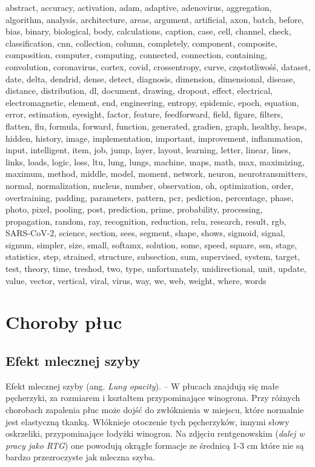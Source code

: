 \documentclass{article}
\begin{document}
abstract, accuracy, activation, adam, adaptive, adenovirus, aggregation, algorithm, analysis, architecture, areas, argument, artificial, axon, batch, before, bias, binary, biological, body, calculations, caption, case, cell, channel, check, classification, cnn, collection, column, completely, component, composite, composition, computer, computing, connected, connection, containing, convolution, coronavirus, cortex, covid, crossentropy, curve, częstotliwośś, dataset, date, delta, dendrid, dense, detect, diagnosis, dimension, dimensional, disease, distance, distribution, dl, document, drawing, dropout, effect, electrical, electromagnetic, element, end, engineering, entropy, epidemic, epoch, equation, error, estimation, eyesight, factor, feature, feedforward, field, figure, filters, flatten, flu, formula, forward, function, generated, gradien, graph, healthy, heaps, hidden, history, image, implementation, important, improvement, inflammation, input, intelligent, item, job, jump, layer, layout, learning, letter, linear, lines, links, loads, logic, loss, ltu, lung, lungs, machine, maps, math, max, maximizing, maximum, method, middle, model, moment, network, neuron, neurotransmitters, normal, normalization, nucleus, number, observation, oh, optimization, order, overtraining, padding, parameters, pattern, pcr, pediction, percentage, phase, photo, pixel, pooling, post, prediction, prime, probability, processing, propagation, random, ray, recognition, reduction, relu, research, result, rgb, SARS-CoV-2, science, section, sees, segment, shape, shows, sigmoid, signal, signum, simpler, size, small, softamx, solution, some, speed, square, ssn, stage, statistics, step, strained, structure, subsection, sum, supervised, system, target, test, theory, time, treshod, two, type, unfortunately, unidirectional, unit, update, value, vector, vertical, viral, virus, way, we, web, weight, where, words



\section{Choroby płuc}

\subsection{Efekt mlecznej szyby}
Efekt mlecznej szyby (ang. \textit{Lung opacity}). – W płucach znajdują się małe pęcherzyki, za rozmiarem i kształtem przypominające winogrona. Przy różnych chorobach zapalenia płuc może dojść do zwłóknienia w miejscu, które normalnie jest elastyczną tkanką. Włóknieje otoczenie tych pęcherzyków, innymi słowy oskrzeliki, przypominające łodyżki winogron. Na zdjęciu rentgenowskim (\textit{dalej w pracy jako RTG}) one powodują okrągłe formacje ze średnicą 1-3 cm które nie są bardzo przezroczyste jak mleczna szyba.
\end{document}

